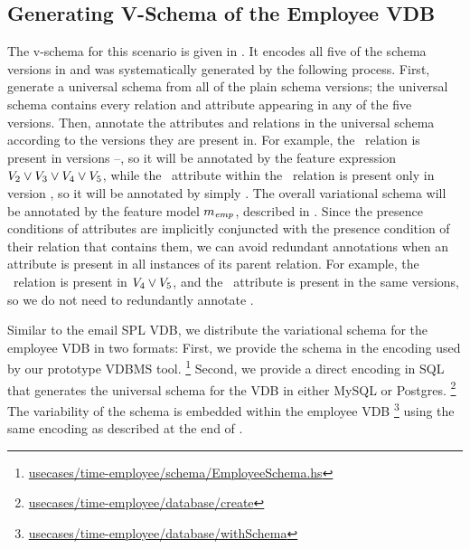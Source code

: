\subsection{Generating V-Schema of the Employee VDB}
\label{sec:emp-vsch}



The v-schema for this scenario is given in . It
encodes all five of the schema versions in  and was
systematically generated by the following process. First, generate a universal
schema from all of the plain schema versions; the universal schema contains
every relation and attribute appearing in any of the five versions. Then,
annotate the attributes and relations in the universal schema according to the
versions they are present in.
%
For example, the \empacct\ relation is present in versions \vTwo--\vFive, so it
will be annotated by the feature expression
$\vTwo\vee\vThree\vee\vFour\vee\vFive$, while the \salary\ attribute within the
\empacct\ relation is present only in version \vFive, so it will be annotated
by simply \vFive.
%
 The overall variational schema will be annotated by the feature model
 $\fModel_\employee$, described in .
%
Since the presence conditions of attributes are implicitly conjuncted with the
presence condition of their relation
 that contains them, 
 we can avoid redundant
annotations when an attribute is present in all instances of its parent
relation. For example, the \empbio\ relation is present in $\vFour\vee\vFive$,
and the \birthdate\ attribute is present in the same versions, so we do not
need to redundantly annotate 
 \birthdate.

Similar to the email SPL VDB, we distribute the variational schema for the
employee VDB in two formats:
%
First, we provide the schema in the encoding used by our prototype VDBMS tool.%
\footnote{\href{https://github.com/lambda-land/VDBMS/blob/master/usecases/time-employee/schema/EmployeeSchema.hs}{usecases/time-employee/schema/EmployeeSchema.hs}}
%
Second, we provide a direct encoding in SQL that generates the universal schema
for the VDB in either MySQL or Postgres.%
\footnote{\href{https://github.com/lambda-land/VDBMS/tree/master/usecases/time-employee/database/create}{usecases/time-employee/database/create}}
%
The variability of the schema is embedded within the employee VDB%
\footnote{\href{https://github.com/lambda-land/VDBMS/tree/master/usecases/time-employee/database/withSchema}{usecases/time-employee/database/withSchema}}
%
using the same encoding as described at the end of .

